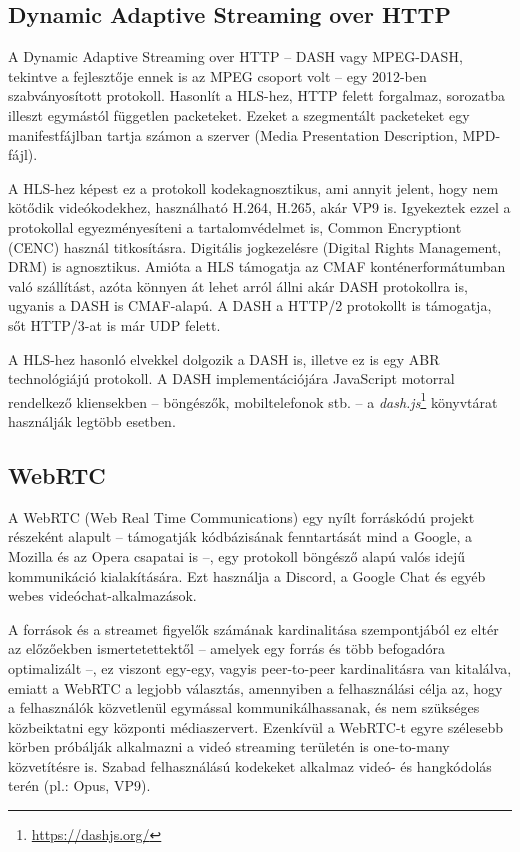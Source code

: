 \subsection{Dynamic Adaptive Streaming over HTTP}

A Dynamic Adaptive Streaming over HTTP -- DASH vagy MPEG-DASH, tekintve a fejlesztője ennek is az MPEG csoport volt -- egy 2012-ben szabványosított protokoll. Hasonlít a HLS-hez, HTTP felett forgalmaz, sorozatba illeszt egymástól független packeteket. Ezeket a szegmentált packeteket egy manifestfájlban tartja számon a szerver (Media Presentation Description, MPD-fájl). \cite{Dash}

A HLS-hez képest ez a protokoll kodekagnosztikus, ami annyit jelent, hogy nem kötődik videókodekhez, használható H.264, H.265, akár VP9 is. \cite{DashIso} Igyekeztek ezzel a protokollal egyezményesíteni a tartalomvédelmet is, Common Encryptiont (CENC) használ titkosításra. Digitális jogkezelésre (Digital Rights Management, DRM) is agnosztikus. Amióta a HLS támogatja az CMAF konténerformátumban való szállítást, azóta könnyen át lehet arról állni akár DASH protokollra is, ugyanis a DASH is CMAF-alapú. A DASH a HTTP/2 protokollt is támogatja, sőt HTTP/3-at is már UDP felett.

A HLS-hez hasonló elvekkel dolgozik a DASH is, illetve ez is egy ABR technológiájú protokoll. A DASH implementációjára JavaScript motorral rendelkező kliensekben -- böngészők, mobiltelefonok stb. -- a \emph{dash.js}\footnote{\url{https://dashjs.org/}} könyvtárat használják legtöbb esetben.

\subsection{WebRTC}

A WebRTC (Web Real Time Communications) egy nyílt forráskódú projekt részeként alapult -- támogatják kódbázisának fenntartását mind a Google, a Mozilla és az Opera csapatai is --, egy protokoll böngésző alapú valós idejű kommunikáció kialakítására. Ezt használja a Discord, a Google Chat és egyéb webes videóchat-alkalmazások. \cite{StreamingHistory}

A források és a streamet figyelők számának kardinalitása szempontjából ez eltér az előzőekben ismertetettektől -- amelyek egy forrás és több befogadóra optimalizált --, ez viszont egy-egy, vagyis peer-to-peer kardinalitásra van kitalálva, emiatt a WebRTC a legjobb választás, amennyiben a felhasználási célja az, hogy a felhasználók közvetlenül egymással kommunikálhassanak, és nem szükséges közbeiktatni egy központi médiaszervert. Ezenkívül a WebRTC-t egyre szélesebb körben próbálják alkalmazni a videó streaming területén is one-to-many közvetítésre is. Szabad felhasználású kodekeket alkalmaz videó- és hangkódolás terén (pl.: Opus, VP9). \cite{WebRTC}
